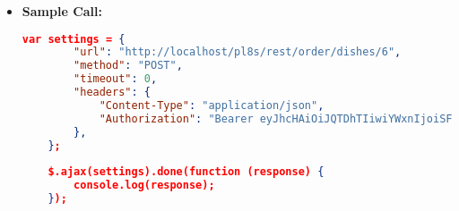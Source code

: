 \begin{itemize}
    \item \textbf{Sample Call:}
		\begin{lstlisting}[language=json]		
	var settings = {
		"url": "http://localhost/pl8s/rest/order/dishes/6",
		"method": "POST",
		"timeout": 0,
		"headers": {
			"Content-Type": "application/json",
			"Authorization": "Bearer eyJhcHAiOiJQTDhTIiwiYWxnIjoiSFM1MTIifQ.eyJ1aWQiOjMsInJvbCI6ImN1c3 RvbWVyIiwic3RyIjoiY3VzX1B3OHJKbmd5eldOcmZ5IiwiZGF0IjoxNzE0MzQyNjA xNjMwfQ.RrH8ojpudntUVEZVnbvVw1GpUEU56tdnhnCSrnCqoHgUAwMMxXJDcTMfK azQmrIZ_OSfges7-lECny6p-t5ITA"
		},
	};
	
	$.ajax(settings).done(function (response) {
		console.log(response);
	});
	\end{lstlisting}
  \end{itemize}		
